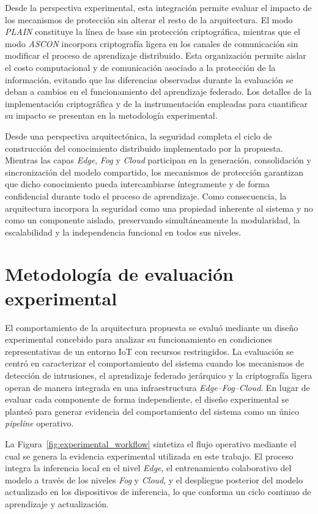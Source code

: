\documentclass[journal,article,submit,moreauthors]{Definitions/mdpi}
\begin{document}
Desde la perspectiva experimental, esta integración permite evaluar el impacto de los mecanismos de protección sin alterar el resto de la arquitectura. El modo \textit{PLAIN} constituye la línea de base sin protección criptográfica, mientras que el modo \textit{ASCON} incorpora criptografía ligera en los canales de comunicación sin modificar el proceso de aprendizaje distribuido. Esta organización permite aislar el costo computacional y de comunicación asociado a la protección de la información, evitando que las diferencias observadas durante la evaluación se deban a cambios en el funcionamiento del aprendizaje federado. Los detalles de la implementación criptográfica y de la instrumentación empleadas para cuantificar su impacto se presentan en la metodología experimental.

Desde una perspectiva arquitectónica, la seguridad completa el ciclo de construcción del conocimiento distribuido implementado por la propuesta. Mientras las capas \textit{Edge}, \textit{Fog} y \textit{Cloud} participan en la generación, consolidación y sincronización del modelo compartido, los mecanismos de protección garantizan que dicho conocimiento pueda intercambiarse íntegramente y de forma confidencial durante todo el proceso de aprendizaje. Como consecuencia, la arquitectura incorpora la seguridad como una propiedad inherente al sistema y no como un componente aislado, preservando simultáneamente la modularidad, la escalabilidad y la independencia funcional en todos sus niveles.

\section{Metodología de evaluación experimental}
\label{methodology}

El comportamiento de la arquitectura propuesta se evaluó mediante un diseño experimental concebido para analizar su funcionamiento en condiciones representativas de un entorno IoT con recursos restringidos. La evaluación se centró en caracterizar el comportamiento del sistema cuando los mecanismos de detección de intrusiones, el aprendizaje federado jerárquico y la criptografía ligera operan de manera integrada en una infraestructura \textit{Edge--Fog--Cloud}. En lugar de evaluar cada componente de forma independiente, el diseño experimental se planteó para generar evidencia del comportamiento del sistema como un único \textit{pipeline} operativo.

La Figura~\ref{fig:experimental_workflow} sintetiza el flujo operativo mediante el cual se genera la evidencia experimental utilizada en este trabajo. El proceso integra la inferencia local en el nivel \textit{Edge}, el entrenamiento colaborativo del modelo a través de los niveles \textit{Fog} y \textit{Cloud}, y el despliegue posterior del modelo actualizado en los dispositivos de inferencia, lo que conforma un ciclo continuo de aprendizaje y actualización.
\end{document}
